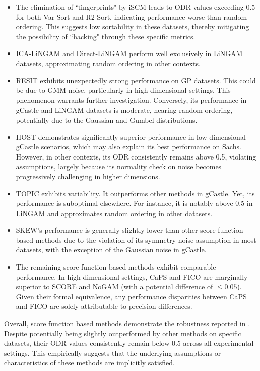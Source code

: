 \documentclass{article}
\theoremstyle{plain}
\theoremstyle{definition}
\theoremstyle{remark}
\begin{document}
\begin{itemize}[leftmargin=*]
\itemsep0em
\item The elimination of ``fingerprints" by iSCM leads to ODR values exceeding 0.5 for both Var-Sort and R2-Sort, indicating performance worse than random ordering. This suggests low sortability in these datasets, thereby mitigating the possibility of ``hacking" through these specific metrics.
\item ICA-LiNGAM and Direct-LiNGAM perform well exclusively in LiNGAM datasets, approximating random ordering in other contexts.
\item RESIT exhibits unexpectedly strong performance on GP datasets. This could be due to GMM noise, particularly in high-dimensional settings. This phenomenon warrants further investigation. Conversely, its performance in gCastle and LiNGAM datasets is moderate, nearing random ordering, potentially due to the Gaussian and Gumbel distributions.
\item HOST demonstrates significantly superior performance in low-dimensional gCastle scenarios, which may also explain its best performance on Sachs. However, in other contexts, its ODR consistently remains above 0.5, violating assumptions, largely because its normality check on noise becomes progressively challenging in higher dimensions.
\item TOPIC exhibits variability. It outperforms other methods in gCastle. Yet, its performance is suboptimal elsewhere. For instance, it is notably above 0.5 in LiNGAM and approximates random ordering in other datasets.
\item SKEW's performance is generally slightly lower than other score function based methods due to the violation of its symmetry noise assumption in most datasets, with the exception of the Gaussian noise in gCastle.
\item The remaining score function based methods exhibit comparable performance. In high-dimensional settings, CaPS and FICO are marginally superior to SCORE and NoGAM (with a potential difference of $\le0.05$). Given their formal equivalence, any performance disparities between CaPS and FICO are solely attributable to precision differences.
\end{itemize}

Overall, score function based methods demonstrate the robustness reported in \citet{Montagna2023}. Despite potentially being slightly outperformed by other methods on specific datasets, their ODR values consistently remain below 0.5 across all experimental settings. This empirically suggests that the underlying assumptions or characteristics of these methods are implicitly satisfied.
\end{document}
